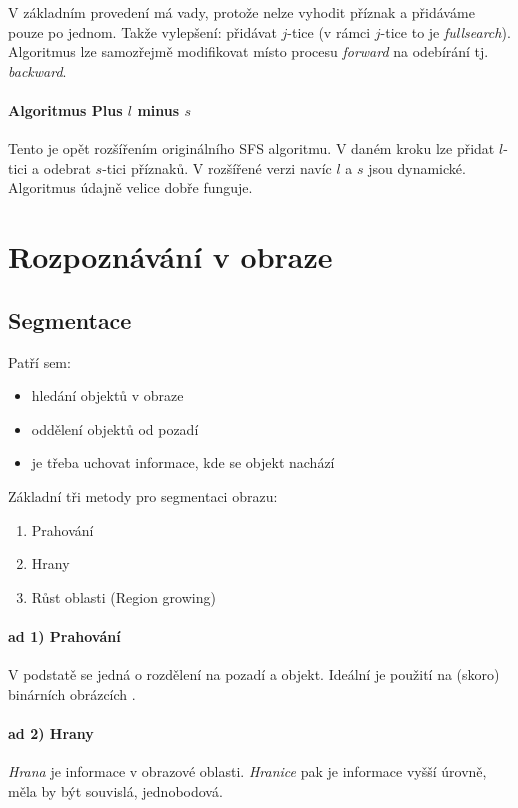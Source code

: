 V základním provedení má vady, protože nelze vyhodit příznak a přidáváme pouze po jednom. Takže vylepšení:
přidávat $j$-tice (v rámci $j$-tice to je {\em fullsearch}). Algoritmus lze samozřejmě modifikovat 
místo procesu {\em forward} na odebírání tj. {\em backward}.

\paragraph{Algoritmus Plus $l$ minus $s$}
Tento je opět rozšířením originálního SFS algoritmu. V daném kroku lze přidat $l$-tici a odebrat $s$-tici příznaků.
V rozšířené verzi navíc $l$ a $s$ jsou dynamické. Algoritmus údajně velice dobře funguje. 

\section{Rozpoznávání v obraze}
\subsection{Segmentace}
Patří sem:
\begin{itemize}
\item hledání objektů v obraze
\item oddělení objektů od pozadí
\item je třeba uchovat informace, kde se objekt nachází
\end{itemize}

Základní tři metody pro segmentaci obrazu:
\begin{enumerate}
\item Prahování
\item Hrany
\item Růst oblasti (Region growing)
\end{enumerate}

\paragraph{ad 1) Prahování}
V podstatě se jedná o rozdělení na pozadí a objekt. Ideální je použití na (skoro) binárních obrázcích . 

\paragraph{ad 2) Hrany}

{\em Hrana} je informace v obrazové oblasti. {\em Hranice} pak je informace vyšší úrovně, měla by být souvislá, 
jednobodová.

